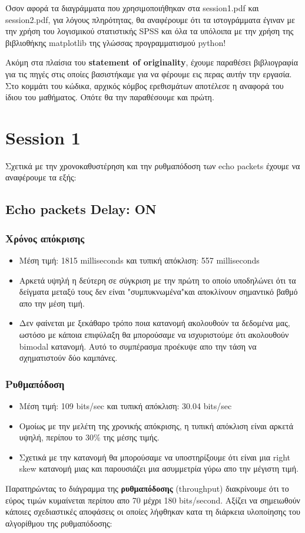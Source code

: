 \documentclass[hidelinks, 12pt, a4paper]{article}
\begin{document}
Όσον αφορά τα διαγράμματα που χρησιμοποιήθηκαν στα session1.pdf και session2.pdf, για λόγους πληρότητας, θα αναφέρουμε ότι τα ιστογράμματα έγιναν με την χρήση του λογισμικού στατιστικής SPSS και όλα τα υπόλοιπα με την χρήση της βιβλιοθήκης matplotlib της γλώσσας προγραμματισμού python! 

Ακόμη στα πλαίσια του \textbf{statement of originality}, έχουμε παραθέσει βιβλιογραφία για τις πηγές στις οποίες βασιστήκαμε για να φέρουμε εις περας αυτήν την εργασία. Στο κομμάτι του κώδικα, αρχικός κόμβος ερεθισμάτων αποτέλεσε η αναφορά του ίδιου του μαθήματος. Οπότε θα την παραθέσουμε και πρώτη\cite{ergasia2}.
\section{Session 1}


Σχετικά με την χρονοκαθυστέρηση και την ρυθμαπόδοση των echo packets έχουμε να αναφέρουμε τα εξής:

\subsection{Echo packets Delay: ON}

\subsubsection{Χρόνος απόκρισης}
\begin{itemize}
    \item Μέση τιμή: 1815 milliseconds και τυπική απόκλιση: 557 milliseconds
    \item Αρκετά υψηλή η δεύτερη σε σύγκριση με την πρώτη το οποίο υποδηλώνει ότι τα δείγματα μεταξύ τους δεν είναι "συμπυκνωμένα"και αποκλίνουν σημαντικό βαθμό απο την μέση τιμή.
    \item Δεν φαίνεται με ξεκάθαρο τρόπο ποια κατανομή ακολουθούν τα δεδομένα μας, ωστόσο με κάποια επιφύλαξη θα μπορούσαμε να ισχυριστούμε ότι ακολουθούν bimodal κατανομή. Αυτό το συμπέρασμα προέκυψε απο την τάση να σχηματιστούν δύο καμπάνες.
\end{itemize}

\subsubsection{Ρυθμαπόδοση}

\begin{itemize}
    \item Μέση τιμή: 109 bits/sec και τυπική απόκλιση: 30.04 bits/sec
    \item Ομοίως με την μελέτη της χρονικής απόκρισης, η τυπική απόκλιση είναι αρκετά υψηλή, περίπου το 30\% της μέσης τιμής.
    \item Σχετικά με την κατανομή θα μπορούσαμε να υποστηρίξουμε ότι είναι μια right skew κατανομή μιας και παρουσιάζει μια ασυμμετρία γύρω απο την μέγιστη τιμή.
\end{itemize}
Παρατηρώντας το διάγραμμα της \textbf{ρυθμαπόδοσης} (throughput) διακρίνουμε ότι το εύρος τιμών κυμαίνεται περίπου απο 70 μέχρι 180 bits/second. Αξίζει να σημειωθούν κάποιες σχεδιαστικές αποφάσεις οι οποίες λήφθηκαν κατα τη διάρκεια υλοποίησης του αλγορίθμου της ρυθμαπόδοσης:
\end{document}
